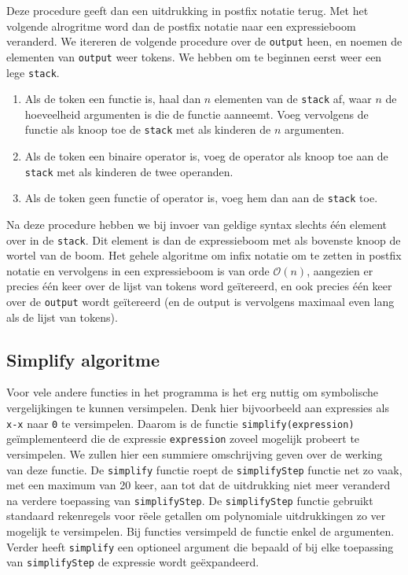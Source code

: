 \documentclass[a4paper]{article}
\newcommand{\ttt}[1]{\texttt{#1}}
\begin{document}
Deze procedure geeft dan een uitdrukking in postfix notatie terug. Met het volgende alrogritme word dan de postfix notatie naar een expressieboom veranderd. We itereren de volgende procedure over de \ttt{output} heen, en noemen de elementen van \ttt{output} weer tokens. We hebben om te beginnen eerst weer een lege \ttt{stack}.
\begin{enumerate}
\item Als de token een functie is, haal dan $n$ elementen van de \ttt{stack} af, waar $n$ de hoeveelheid argumenten is die de functie aanneemt. Voeg vervolgens de functie als knoop toe de \ttt{stack} met als kinderen de $n$ argumenten. 
\item Als de token een binaire operator is, voeg de operator als knoop toe aan de \ttt{stack} met als kinderen de twee operanden.
\item Als de token geen functie of operator is, voeg hem dan aan de \ttt{stack} toe.
\end{enumerate}
Na deze procedure hebben we bij invoer van geldige syntax slechts \'e\'en element over in de \ttt{stack}. Dit element is dan de expressieboom met als bovenste knoop de wortel van de boom. Het gehele algoritme om infix notatie om te zetten in postfix notatie en vervolgens in een expressieboom is van orde $\mathcal{O}(n)$, aangezien er precies \'e\'en keer over de lijst van tokens word ge\"itereerd, en ook precies \'e\'en keer over de \ttt{output} wordt ge\"itereerd (en de output is vervolgens maximaal even lang als de lijst van tokens).

\subsection{Simplify algoritme}
Voor vele andere functies in het programma is het erg nuttig om symbolische vergelijkingen te kunnen versimpelen. Denk hier bijvoorbeeld aan expressies als \ttt{x-x} naar \ttt{0} te versimpelen. Daarom is de functie \ttt{simplify(expression)} ge\"implementeerd die de expressie \ttt{expression} zoveel mogelijk probeert te versimpelen. We zullen hier een summiere omschrijving geven over de werking van deze functie. De \ttt{simplify} functie roept de \ttt{simplifyStep} functie net zo vaak, met een maximum van 20 keer, aan tot dat de uitdrukking niet meer veranderd na verdere toepassing van \ttt{simplifyStep}. De \ttt{simplifyStep} functie gebruikt standaard rekenregels voor r\"eele getallen om polynomiale uitdrukkingen zo ver mogelijk te versimpelen. Bij functies versimpeld de functie enkel de argumenten. Verder heeft \ttt{simplify} een optioneel argument die bepaald of bij elke toepassing van \ttt{simplifyStep} de expressie wordt ge\"expandeerd. 
\end{document}
